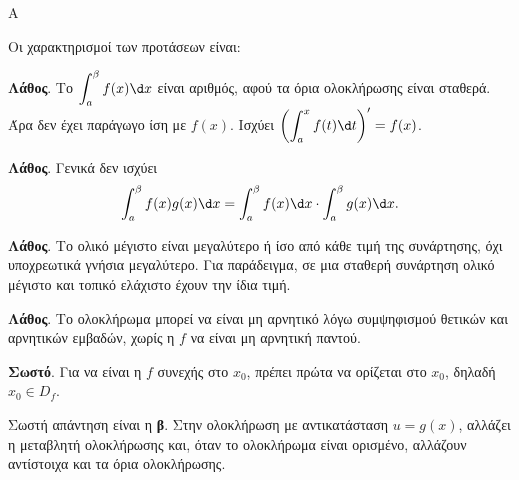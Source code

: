 \begin{thema}{Α}
\begin{erwthma}
\item {}

\item {}

\item {}

\item Οι χαρακτηρισμοί των προτάσεων είναι:
\begin{alist}
\item \textbf{Λάθος}. Το $\dint_a^\beta f(x)\d x$ είναι αριθμός, αφού τα όρια ολοκλήρωσης είναι σταθερά. Άρα δεν έχει παράγωγο ίση με $f(x)$. Ισχύει $ \left(\dint_a^x f(t)\d t\right)'=f(x)$.
\item \textbf{Λάθος}. Γενικά δεν ισχύει
\[ \dint_a^\beta f(x)g(x)\d x=\dint_a^\beta f(x)\d x\cdot\dint_a^\beta g(x)\d x. \]
\item \textbf{Λάθος}. Το ολικό μέγιστο είναι μεγαλύτερο ή ίσο από κάθε τιμή της συνάρτησης, όχι υποχρεωτικά γνήσια μεγαλύτερο. Για παράδειγμα, σε μια σταθερή συνάρτηση ολικό μέγιστο και τοπικό ελάχιστο έχουν την ίδια τιμή.
\item \textbf{Λάθος}. Το ολοκλήρωμα μπορεί να είναι μη αρνητικό λόγω συμψηφισμού θετικών και αρνητικών εμβαδών, χωρίς η $f$ να είναι μη αρνητική παντού.
\item \textbf{Σωστό}. Για να είναι η $f$ συνεχής στο $x_0$, πρέπει πρώτα να ορίζεται στο $x_0$, δηλαδή $x_0\in D_f$.
\end{alist}

\item Σωστή απάντηση είναι η \textbf{β}. Στην ολοκλήρωση με αντικατάσταση $u=g(x)$, αλλάζει η μεταβλητή ολοκλήρωσης και, όταν το ολοκλήρωμα είναι ορισμένο, αλλάζουν αντίστοιχα και τα όρια ολοκλήρωσης.
\end{erwthma}
\end{thema}


